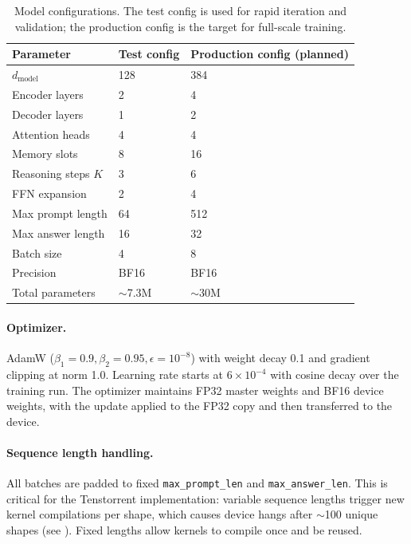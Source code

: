 \documentclass[11pt,a4paper]{article}
\begin{document}
\begin{table}[h]
\centering
\small
\begin{tabularx}{\textwidth}{p{} p{} p{}}
\toprule
\textbf{Parameter} & \textbf{Test config} & \textbf{Production config (planned)} \\
\midrule
$d_{\text{model}}$ & 128 & 384 \\
Encoder layers & 2 & 4 \\
Decoder layers & 1 & 2 \\
Attention heads & 4 & 4 \\
Memory slots & 8 & 16 \\
Reasoning steps $K$ & 3 & 6 \\
FFN expansion & 2 & 4 \\
Max prompt length & 64 & 512 \\
Max answer length & 16 & 32 \\
Batch size & 4 & 8 \\
Precision & BF16 & BF16 \\
Total parameters & $\sim$7.3M & $\sim$30M \\
\bottomrule
\end{tabularx}
\caption{Model configurations. The test config is used for rapid iteration and validation; the production config is the target for full-scale training.}
\label{tab:configs}
\end{table}

\paragraph{Optimizer.}
AdamW ($\beta_1=0.9, \beta_2=0.95, \epsilon=10^{-8}$) with weight decay 0.1 and gradient clipping at norm 1.0. Learning rate starts at $6 \times 10^{-4}$ with cosine decay over the training run. The optimizer maintains FP32 master weights and BF16 device weights, with the update applied to the FP32 copy and then transferred to the device.

\paragraph{Sequence length handling.}
All batches are padded to fixed \texttt{max\_prompt\_len} and \texttt{max\_answer\_len}. This is critical for the Tenstorrent implementation: variable sequence lengths trigger new kernel compilations per shape, which causes device hangs after $\sim$100 unique shapes (see ). Fixed lengths allow kernels to compile once and be reused.
\end{document}
